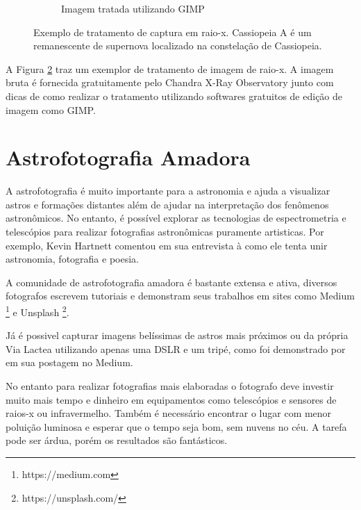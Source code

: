 \documentclass[
	article,			%
	12pt,				%
	oneside,			%
	a4paper,			%
	english,			%
	brazil,				%
	sumario=tradicional
	]{abntex2}
\begin{document}
\begin{figure}
\begin{subfigure}[hb]{0.45\textwidth}
        \caption{Imagem tratada utilizando GIMP}
        \label{fig:colorspace}
	\end{subfigure}
    \caption{Exemplo de tratamento de captura em raio-x. Cassiopeia A é um remanescente de supernova localizado na constelação de Cassiopeia.}\label{fig:example}
\end{figure}

A Figura \ref{fig:example} traz um exemplor de tratamento de imagem de raio-x.
A imagem bruta é fornecida gratuitamente pelo Chandra X-Ray Observatory junto
com dicas de como realizar o tratamento utilizando softwares gratuitos de edição
de imagem como GIMP. \cite{openfits}

\section{Astrofotografia Amadora}
\label{amauter}

A astrofotografia é muito importante para a astronomia e ajuda a visualizar
astros e formações distantes além de ajudar na interpretação dos fenômenos
astronômicos. No entanto, é possível explorar as tecnologias de espectrometria
e telescópios para realizar fotografias astronômicas puramente artisticas. Por
exemplo, Kevin Hartnett comentou em sua entrevista à
 como ele tenta unir astronomia, fotografia e
poesia.

A comunidade de astrofotografia amadora é bastante extensa e ativa, diversos
fotografos escrevem tutoriais e demonstram seus trabalhos em sites como Medium
\footnote{https://medium.com} e Unsplash \footnote{https://unsplash.com/}.

Já é possivel capturar imagens belíssimas de astros mais próximos ou da própria
Via Lactea utilizando apenas uma DSLR e um tripé, como foi demonstrado por
 em sua postagem no Medium.

No entanto para realizar fotografias mais elaboradas o fotografo deve investir
muito mais tempo e dinheiro em equipamentos como telescópios e sensores de
raios-x ou infravermelho. Também é necessário encontrar o lugar com menor
poluição luminosa e esperar que o tempo seja bom, sem nuvens no céu. A tarefa
pode ser árdua, porém os resultados são fantásticos.

% 

\end{document}
